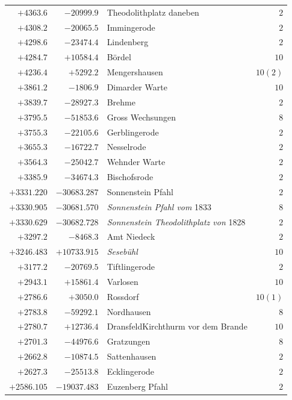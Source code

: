 \begin{center}
\begin{tabular}{r|r|p{170pt}|r}
\(+4363.6\)&\(-20999.9\)&Theodolithplatz daneben&\(2\)\\
\(+4308.2\)&\(-20065.5\)&Immingerode&\(2\)\\
\(+4298.6\)&\(-23474.4\)&Lindenberg&\(2\)\\
\(+4284.7\)&\(+10584.4\)&Bördel&\(10\)\\
\(+4236.4\)&\(+5292.2\)&Mengershausen&\(10(2)\)\\
\(+3861.2\)&\(-1806.9\)&Dimarder Warte&\(10\)\\
\(+3839.7\)&\(-28927.3\)&Brehme&\(2\)\\
\(+3795.5\)&\(-51853.6\)&Gross Wechsungen&\(8\)\\
\(+3755.3\)&\(-22105.6\)&Gerblingerode&\(2\)\\
\(+3655.3\)&\(-16722.7\)&Nesselrode&\(2\)\\
\(+3564.3\)&\(-25042.7\)&Wehnder Warte&\(2\)\\
\(+3385.9\)&\(-34674.3\)&Bischofsrode&\(2\)\\
\(+3331.220\)&\(-30683.287\)&Sonnenstein Pfahl&\(2\)\\
\(+3330.905\)&\(-30681.570\)&\textit{Sonnenstein Pfahl vom} 1833&\(8\)\\
\(+3330.629\)&\(-30682.728\)&\textit{Sonnenstein Theodolithplatz von} 1828&\(2\)\\
\(+3297.2\)&\(-8468.3\)&Amt Niedeck&\(2\)\\
\(+3246.483\)&\(+10733.915\)&\textit{Sesebühl}&\(10\)\\
\(+3177.2\)&\(-20769.5\)&Tiftlingerode&\(2\)\\
\(+2943.1\)&\(+15861.4\)&Varlosen&\(10\)\\
\(+2786.6\)&\(+3050.0\)&Rossdorf&\(10(1)\)\\
\(+2783.8\)&\(-59292.1\)&Nordhausen&\(8\)\\
\(+2780.7\)&\(+12736.4\)&DransfeldKirchthurm vor dem Brande&\(10\)\\
\(+2701.3\)&\(-44976.6\)&Gratzungen&\(8\)\\
\(+2662.8\)&\(-10874.5\)&Sattenhausen&\(2\)\\
\(+2627.3\)&\(-25513.8\)&Ecklingerode&\(2\)\\
\(+2586.105\)&\(-19037.483\)&Euzenberg Pfahl&\(2\)\\
\hline\end{tabular}\endgroup\end{center}
\clearpage
